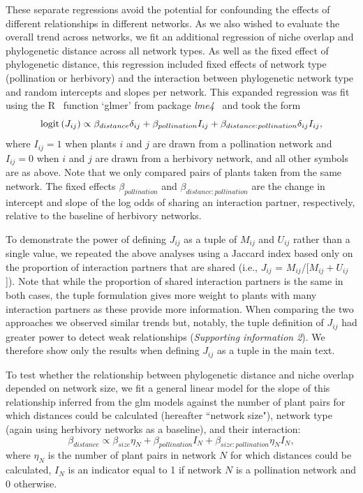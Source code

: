 \documentclass[12pt]{article}
\begin{document}
\begin{spacing}{1.5}
    These separate regressions avoid the potential for confounding the effects
    of different relationships in different networks. As we also wished to 
    evaluate the overall trend across networks, we fit an additional
    regression of niche overlap and phylogenetic distance across all network 
    types. As well as the fixed effect of phylogenetic distance, this 
    regression included fixed effects of network type (pollination or 
    herbivory) and the interaction between phylogenetic network type and 
    random intercepts and slopes per network. This expanded regression was fit
    using the R~\citep{R} function `glmer' from package 
    \emph{lme4}~\citep{lme4} and took the form
      \begin{equation}
        {\rm logit}\left(J_{ij}\right) \propto \beta_{distance} \delta_{ij} + \beta_{pollination} I_{ij} + \beta_{distance:pollination} \delta_{ij} I_{ij} ,
      \end{equation}
    where $I_{ij}=1$ when plants $i$ and $j$ are drawn from a 
    pollination network and $I_{ij}=0$ when $i$ and $j$ are drawn from a herbivory network, and all other symbols 
    are as above. Note that we only compared pairs of plants taken from the 
    same network. The fixed effects $\beta_{pollination}$ and $\beta_{distance:pollination}$ 
    are the change in intercept and slope of the log odds of sharing an 
    interaction partner, respectively, relative to the baseline of 
    herbivory networks.


    To demonstrate the power of defining $J_{ij}$ as a tuple of $M_{ij}$ and $U_{ij}$ rather than a single value, we repeated the above analyses using a Jaccard index based only on the proportion of interaction partners that are shared (i.e., $J_{ij}$ = $M_{ij}$/[$M_{ij}+U_{ij}$]). Note that while the proportion of shared interaction partners is the same in both cases, the tuple formulation gives more weight to plants with many interaction partners as these provide more information. When comparing the two approaches 
    we observed similar trends but, notably, the tuple definition of $J_{ij}$ had greater power to detect weak relationships (\emph{Supporting information 2}). We therefore show only the results when defining $J_{ij}$ as a tuple in the main text.


    To test whether the relationship between phylogenetic distance and niche overlap depended on network size, we fit a general linear model for the slope of this relationship inferred from the glm models against the number of plant pairs for which distances could be calculated (hereafter ``network size"), network type (again using herbivory networks as a baseline), and their interaction:
      \begin{equation}
        \beta_{distance} \propto \beta_{size} \eta_{N} + \beta_{pollination} I_N + \beta_{size:pollination} \eta_{N} I_N ,
      \end{equation}
    where $\eta_{N}$ is the number of plant pairs in network $N$ for which distances could be calculated, $I_N$ is an indicator equal to 1 if network $N$ is a pollination network and 0 otherwise. 



\end{spacing}
\end{document}
